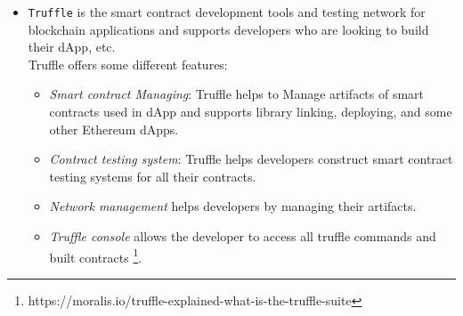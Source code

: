 \begin{itemize}
  \item \texttt{Truffle} is the smart contract development tools and testing network for blockchain applications and supports developers who are looking to build their dApp, etc. \\
   Truffle offers some different features:
 \begin{itemize}
  \item\textit{Smart contract Managing}: Truffle helps to Manage artifacts of smart contracts used in dApp and supports library linking, deploying, and some other Ethereum dApps. \\
 \item\textit{Contract testing system}: Truffle helps developers construct smart contract testing systems for all their contracts. \\
 \item\textit{Network management} helps developers by managing their artifacts. \\
 \item\textit{Truffle console} allows the developer to access all truffle commands and built contracts \footnote{https://moralis.io/truffle-explained-what-is-the-truffle-suite}.
 \end{itemize}


\end{itemize}
